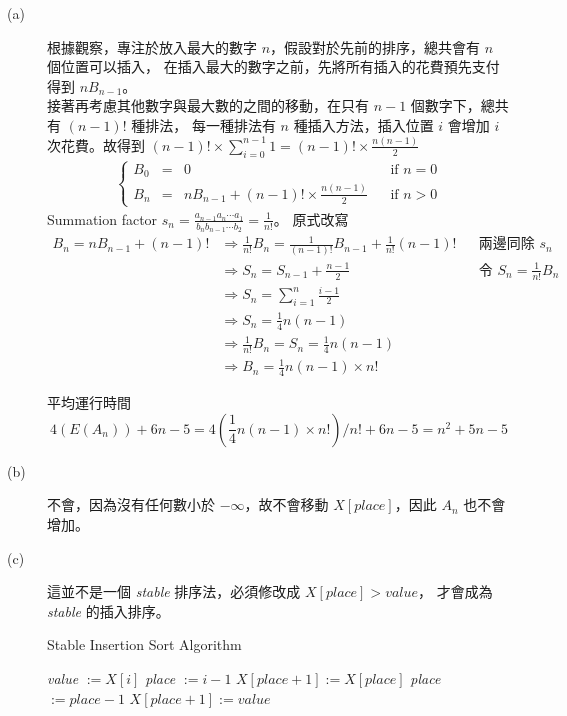 \documentclass[11pt]{article}
\begin{document}
\begin{description}
	\item[(a)] 
		根據觀察，專注於放入最大的數字 $n$，假設對於先前的排序，總共會有 $n$ 個位置可以插入，
		在插入最大的數字之前，先將所有插入的花費預先支付得到 $n B_{n-1}$。 \\
		接著再考慮其他數字與最大數的之間的移動，在只有 $n-1$ 個數字下，總共有 $(n-1)!$ 種排法，
		每一種排法有 $n$ 種插入方法，插入位置 $i$ 會增加 $i$ 次花費。故得到 $(n-1)! \times \sum_{i=0}^{n-1} 1 = (n-1)! \times \frac{n(n-1)}{2}$
		\begin{align*}
			\left\{\begin{matrix}
				B_0 &=& 0 && \text{if } n = 0\\
				B_n &=& n B_{n-1} + (n-1)! \times \frac{n(n-1)}{2} && \text{if } n > 0
			\end{matrix}\right.
		\end{align*}
		Summation factor $s_n = \frac{a_{n-1} a_n \cdots a_1}{b_n b_{n-1} \cdots b_2} = \frac{1}{n!}$。
		原式改寫
		\begin{align*}
			B_n = n B_{n-1} + (n-1)! 
			&\Rightarrow \frac{1}{n!}B_n = \frac{1}{(n-1)!} B_{n-1} + \frac{1}{n!}(n-1)! 
				&& \text{兩邊同除 } s_n\\
			&\Rightarrow S_n = S_{n-1} + \frac{n-1}{2} 
				&& \text{令 } S_n = \frac{1}{n!} B_n\\
			&\Rightarrow S_n = \sum_{i=1}^{n} \frac{i-1}{2} \\
			&\Rightarrow S_n = \frac{1}{4} n(n-1) \\
			&\Rightarrow \frac{1}{n!}B_n = S_n = \frac{1}{4} n(n-1) \\
			&\Rightarrow B_n = \frac{1}{4} n(n-1) \times n!
		\end{align*}
		
		平均運行時間 $$4(E(A_n)) + 6n - 5 = 4(\frac{1}{4} n(n-1) \times n!)/n! + 6n - 5 = n^2 + 5n - 5$$
	\item[(b)]
		不會，因為沒有任何數小於 $-\infty$，故不會移動 $X[\textit{place}]$，因此 $A_n$ 也不會增加。
	\item[(c)]
		這並不是一個 \textit{stable} 排序法，必須修改成 $X[\textit{place}] > \textit{value}$，
		才會成為 \textit{stable} 的插入排序。
\begin{algorithm}
  \caption{Stable Insertion Sort Algorithm}\label{insert}
  \begin{algorithmic}[2]
  				
		\State \textit{value} $:= X[i]$		
		\State \textit{place} $:= i-1$		
				
			\State $X[\textit{place}+1] := X[\textit{place}]$	
			\State \textit{place} $:= \textit{place} - 1$	
		\EndWhile
		\State $X[\textit{place}+1] := \textit{value}$	
	\EndFor
  \end{algorithmic}
\end{algorithm}
\end{description}
\end{document}
